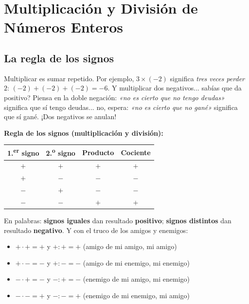 \documentclass[12pt, letterpaper]{article}
\begin{document}
\newpage

\section{Multiplicación y División de Números Enteros}

\subsection{La regla de los signos}

Multiplicar es sumar repetido. Por ejemplo, $3 \times (-2)$ significa \emph{tres veces perder $2$}: $(-2) + (-2) + (-2) = -6$. Y multiplicar dos negativos... \textquestiondown sabías que da positivo? Piensa en la doble negación: \emph{«no es cierto que no tengo deudas»} significa que sí tengo deudas... no, espera: \emph{«no es cierto que no gané»} significa que sí gané. ¡Dos negativos se anulan!

\begin{cuadroteoria}
  \textbf{Regla de los signos (multiplicación y división):}

  \begin{center}
    \renewcommand{\arraystretch}{1.3}
    \begin{tabular}{cc|cc}
      \toprule
      \textbf{1.\textsuperscript{er} signo} & \textbf{2.\textsuperscript{o} signo} & \textbf{Producto} & \textbf{Cociente} \\
      \midrule
      $+$ & $+$ & $+$ & $+$ \\
      $+$ & $-$ & $-$ & $-$ \\
      $-$ & $+$ & $-$ & $-$ \\
      $-$ & $-$ & $+$ & $+$ \\
      \bottomrule
    \end{tabular}
  \end{center}

  \noindent En palabras: \textbf{signos iguales} dan resultado \textbf{positivo}; \textbf{signos distintos} dan resultado \textbf{negativo}. Y con el truco de los amigos y enemigos:
  \begin{itemize}
    \item $+ \cdot + = +$ \quad y \quad $+ : + = +$ \quad (amigo de mi amigo, mi amigo)
    \item $+ \cdot - = -$ \quad y \quad $+ : - = -$ \quad (amigo de mi enemigo, mi enemigo)
    \item $- \cdot + = -$ \quad y \quad $- : + = -$ \quad (enemigo de mi amigo, mi enemigo)
    \item $- \cdot - = +$ \quad y \quad $- : - = +$ \quad (enemigo de mi enemigo, mi amigo)
  \end{itemize}
\end{cuadroteoria}
\end{document}
